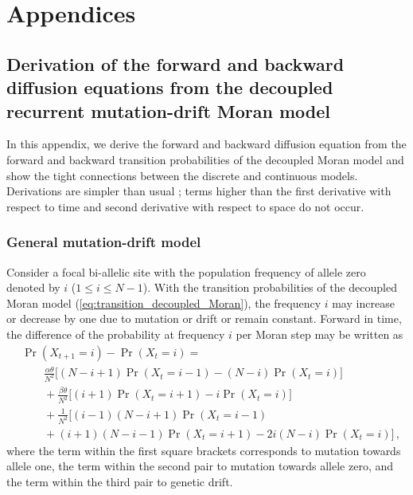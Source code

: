 \documentclass[preprint]{elsarticle}
\newcommand\x[1]{\ensuremath{X_{#1}}}
\begin{document}
{\section{Appendices}

\subsection{Derivation of the forward and backward diffusion equations from the decoupled recurrent mutation-drift Moran model}
\label{section:diffDer}

In this appendix, we derive the forward and backward diffusion equation from the forward and backward transition probabilities of the decoupled Moran model and show the tight connections between the discrete and continuous models. Derivations are simpler than usual \citep{Ewen04}; terms higher than the first derivative with respect to time and second derivative with respect to space do not occur. 

\subsubsection{General mutation-drift model}
Consider a focal bi-allelic site with the population frequency of allele zero denoted by $i$ ($1 \leq i \leq N-1$). With the transition probabilities of the decoupled Moran model (\ref{eq:transition_decoupled_Moran}), the frequency $i$ may increase or decrease by one due to mutation or drift or remain constant. Forward in time, the difference of the probability at frequency $i$ per Moran step may be written as
\begin{equation}\label{eq:forw_discr_mutation}
\begin{split}
&\Pr(\x{t+1}=i)-\Pr(\x{t}=i) = \\
&\qquad \frac{\alpha\theta}{N^2} \bigg[(N-i+1)\Pr(\x{t}=i-1) - (N-i)\Pr(\x{t}=i)\bigg]\\
&\qquad+\frac{\beta\theta}{N^2} \bigg[(i+1)\Pr(\x{t}=i+1) - i\Pr(\x{t}=i)\bigg]\\
&\qquad+\frac1{N^2}\bigg[(i-1)(N-i+1)\Pr(\x{t}=i-1) \\
&\qquad+ (i+1)(N-i-1)\Pr(\x{t}=i+1)-2i(N-i)\Pr(\x{t}=i)\bigg]\,,
\end{split}
\end{equation}
where the term within the first square brackets corresponds to mutation towards allele one, the term within the second pair to mutation towards allele zero, and the term within the third pair to genetic drift.

}
\end{document}
